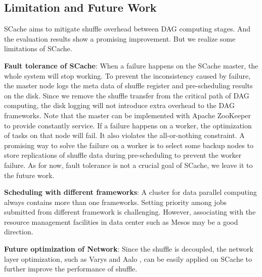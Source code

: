\subsection{Limitation and Future Work}
SCache aims to mitigate shuffle overhead between DAG computing stages. And the evaluation results show a promising improvement. But we realize some limitations of SCache.

\textbf{Fault tolerance of SCache}: When a failure happens on the SCache master, the whole system will stop working. To prevent the inconsistency caused by failure, the master node logs the meta data of shuffle register and pre-scheduling results on the disk. Since we remove the shuffle transfer from the critical path of DAG computing, the disk logging will not introduce extra overhead to the DAG frameworks. Note that the master can be implemented with Apache ZooKeeper \cite{zookeeper} to provide constantly service. If a failure happens on a worker, the optimization of tasks on that node will fail. It also violates the all-or-nothing constraint. A promising way to solve the failure on a worker is to select some backup nodes to store replications of shuffle data during pre-scheduling to prevent the worker failure. As for now, fault tolerance is not a crucial goal of SCache,  we leave it to the future work.

\textbf{Scheduling with different frameworks}: A cluster for data parallel computing always contains more than one frameworks. Setting priority among jobs submitted from different framework is challenging. However, associating with the resource management facilities in data center such as Mesos \cite{mesos} may be a good direction. 

\textbf{Future optimization of Network}: Since the shuffle is decoupled, the network layer optimization, such as Varys \cite{varys} and Aalo \cite{aalo}, can be easily applied on SCache to further improve the performance of shuffle.
